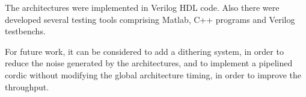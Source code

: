\documentclass[conference]{IEEEtran}
\begin{document}
The architectures were implemented in Verilog HDL code. Also there were developed several testing tools
comprising Matlab, C++ programs and Verilog testbenchs.

For future work, it can be considered to add a dithering system, in order to reduce the noise generated by the architectures, and 
to implement a pipelined cordic without modifying the global architecture timing, in order to improve the throughput. 





%
%
%
\end{document}
